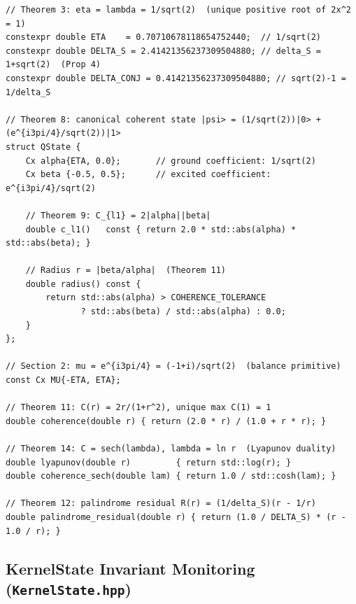 \documentclass[12pt,a4paper]{article}
\theoremstyle{plain}
\theoremstyle{definition}
\theoremstyle{remark}
\begin{document}
\begin{lstlisting}[caption={Critical constants and canonical coherent state.},
                   label={lst:constants}]
// Theorem 3: eta = lambda = 1/sqrt(2)  (unique positive root of 2x^2 = 1)
constexpr double ETA    = 0.70710678118654752440;  // 1/sqrt(2)
constexpr double DELTA_S = 2.41421356237309504880; // delta_S = 1+sqrt(2)  (Prop 4)
constexpr double DELTA_CONJ = 0.41421356237309504880; // sqrt(2)-1 = 1/delta_S

// Theorem 8: canonical coherent state |psi> = (1/sqrt(2))|0> + (e^{i3pi/4}/sqrt(2))|1>
struct QState {
    Cx alpha{ETA, 0.0};       // ground coefficient: 1/sqrt(2)
    Cx beta {-0.5, 0.5};      // excited coefficient: e^{i3pi/4}/sqrt(2)

    // Theorem 9: C_{l1} = 2|alpha||beta|
    double c_l1()   const { return 2.0 * std::abs(alpha) * std::abs(beta); }

    // Radius r = |beta/alpha|  (Theorem 11)
    double radius() const {
        return std::abs(alpha) > COHERENCE_TOLERANCE
               ? std::abs(beta) / std::abs(alpha) : 0.0;
    }
};

// Section 2: mu = e^{i3pi/4} = (-1+i)/sqrt(2)  (balance primitive)
const Cx MU{-ETA, ETA};

// Theorem 11: C(r) = 2r/(1+r^2), unique max C(1) = 1
double coherence(double r) { return (2.0 * r) / (1.0 + r * r); }

// Theorem 14: C = sech(lambda), lambda = ln r  (Lyapunov duality)
double lyapunov(double r)         { return std::log(r); }
double coherence_sech(double lam) { return 1.0 / std::cosh(lam); }

// Theorem 12: palindrome residual R(r) = (1/delta_S)(r - 1/r)
double palindrome_residual(double r) { return (1.0 / DELTA_S) * (r - 1.0 / r); }
\end{lstlisting}

\subsection{KernelState Invariant Monitoring (\texttt{KernelState.hpp})}
\label{app:kernelstate}
\end{document}
